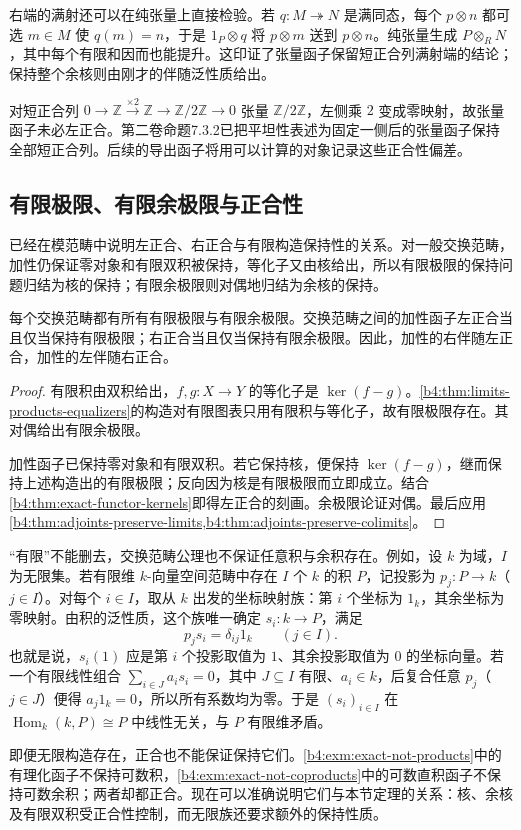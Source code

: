 右端的满射还可以在纯张量上直接检验。若 \(q:M\twoheadrightarrow N\) 是满同态，每个 \(p\otimes n\) 都可选 \(m\in M\) 使 \(q(m)=n\)，于是 \(1_P\otimes q\) 将 \(p\otimes m\) 送到 \(p\otimes n\)。纯张量生成 \(P\otimes_RN\)，其中每个有限和因而也能提升。这印证了张量函子保留短正合列满射端的结论；保持整个余核则由刚才的伴随泛性质给出。

\ProseParagraphBreak
对短正合列 \(0\to\mathbb Z\xrightarrow{\times2}\mathbb Z\to\mathbb Z/2\mathbb Z\to0\) 张量 \(\mathbb Z/2\mathbb Z\)，左侧乘 \(2\) 变成零映射，故张量函子未必左正合。第二卷命题7.3.2已把平坦性表述为固定一侧后的张量函子保持全部短正合列。后续的导出函子将用可以计算的对象记录这些正合性偏差。

\subsection{有限极限、有限余极限与正合性}
\label{b4:subsec:0403:03}

已经在模范畴中说明左正合、右正合与有限构造保持性的关系。对一般交换范畴，加性仍保证零对象和有限双积被保持，等化子又由核给出，所以有限极限的保持问题归结为核的保持；有限余极限则对偶地归结为余核的保持。

\begin{theorem}\label{b4:thm:finite-limits-exactness}
	每个交换范畴都有所有有限极限与有限余极限。交换范畴之间的加性函子左正合当且仅当保持有限极限；右正合当且仅当保持有限余极限。因此，加性的右伴随左正合，加性的左伴随右正合。
\end{theorem}
\begin{proof}
	有限积由双积给出，\(f,g:X\to Y\) 的等化子是 \(\ker(f-g)\)。\cref{b4:thm:limits-products-equalizers}的构造对有限图表只用有限积与等化子，故有限极限存在。其对偶给出有限余极限。

	加性函子已保持零对象和有限双积。若它保持核，便保持 \(\ker(f-g)\)，继而保持上述构造出的有限极限；反向因为核是有限极限而立即成立。结合\cref{b4:thm:exact-functor-kernels}即得左正合的刻画。余极限论证对偶。最后应用\cref{b4:thm:adjoints-preserve-limits,b4:thm:adjoints-preserve-colimits}。
\end{proof}

“有限”不能删去，交换范畴公理也不保证任意积与余积存在。例如，设 \(k\) 为域，\(I\) 为无限集。若有限维 \(k\)-向量空间范畴中存在 \(I\) 个 \(k\) 的积 \(P\)，记投影为 \(p_j:P\to k\)（\(j\in I\)）。对每个 \(i\in I\)，取从 \(k\) 出发的坐标映射族：第 \(i\) 个坐标为 \(1_k\)，其余坐标为零映射。由积的泛性质，这个族唯一确定 \(s_i:k\to P\)，满足
\[
	p_js_i=\delta_{ij}1_k\qquad(j\in I).
\]
也就是说，\(s_i(1)\) 应是第 \(i\) 个投影取值为 \(1\)、其余投影取值为 \(0\) 的坐标向量。若一个有限线性组合 \(\sum_{i\in J}a_is_i=0\)，其中 \(J\subseteq I\) 有限、\(a_i\in k\)，后复合任意 \(p_j\)（\(j\in J\)）便得 \(a_j1_k=0\)，所以所有系数均为零。于是 \((s_i)_{i\in I}\) 在 \(\operatorname{Hom}_k(k,P)\cong P\) 中线性无关，与 \(P\) 有限维矛盾。

\ProseParagraphBreak
即便无限构造存在，正合也不能保证保持它们。\cref{b4:exm:exact-not-products}中的有理化函子不保持可数积，\cref{b4:exm:exact-not-coproducts}中的可数直积函子不保持可数余积；两者却都正合。现在可以准确说明它们与本节定理的关系：核、余核及有限双积受正合性控制，而无限族还要求额外的保持性质。
